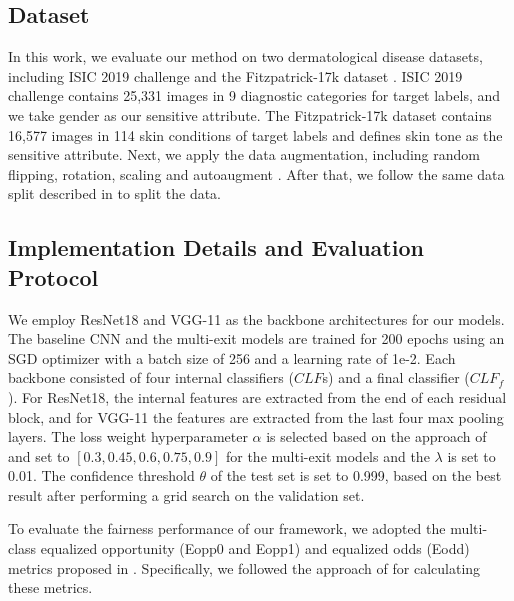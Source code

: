 \subsection{Dataset} 
In this work, we evaluate our method on two dermatological disease datasets, including ISIC 2019 challenge \cite{combalia2019bcn20000,tschandl2018ham10000} and the Fitzpatrick-17k dataset \cite{groh2021evaluating} . ISIC 2019 challenge contains 25,331 images in 9 diagnostic categories for target labels, and we take gender as our sensitive attribute. The Fitzpatrick-17k dataset contains 16,577 images in 114 skin conditions of target labels and defines skin tone as the sensitive attribute. Next, we apply the data augmentation, including random flipping, rotation, scaling and autoaugment \cite{cubuk2018autoaugment}. After that, we follow the same data split described in \cite{wu2022fairprune} to split the data.


\subsection{Implementation Details and Evaluation Protocol}


We employ ResNet18 and VGG-11 as the backbone architectures for our models. The baseline CNN and the multi-exit models are trained for 200 epochs using an SGD optimizer with a batch size of 256 and a learning rate of 1e-2. Each backbone consisted of four internal classifiers ($CLF$s) and a final classifier ($CLF_{f}$). For ResNet18, the internal features are extracted from the end of each residual block, and for VGG-11 the features are extracted from the last four max pooling layers. The loss weight hyperparameter $\alpha$ is selected based on the approach of \cite{kaya2019shallow} and set to $[0.3, 0.45, 0.6, 0.75, 0.9]$ for the multi-exit models and the $\lambda$ is set to 0.01. The confidence threshold $\theta$ of the test set is set to 0.999, based on the best result after performing a grid search on the validation set.

To evaluate the fairness performance of our framework, we adopted the multi-class equalized opportunity (Eopp0 and Eopp1) and equalized odds (Eodd) metrics proposed in \cite{hardt2016equality}. Specifically, we followed the approach of \cite{wu2022fairprune} for calculating these metrics.

